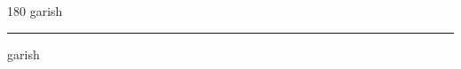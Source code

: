 
\begin{frame}
\begin{center}
\begin{turn}{180}
{\fontsize{2.5cm}{1em}\selectfont garish}
\end{turn}
\vspace{1em}\par  
\hrule
\vspace{1em}\par  
{\fontsize{2.5cm}{1em}\selectfont garish}
\end{center}
\end{frame}

